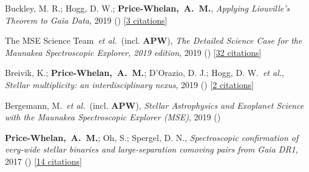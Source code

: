 \item[{\color{deemph}\scriptsize5}]Buckley, M. R.; Hogg, D. W.; \textbf{Price-Whelan,~A.~M.}, \textit{Applying Liouville's Theorem to Gaia Data}, 2019 () [\href{http://adsabs.harvard.edu/abs/2019arXiv190700987B}{3 citations}]

\item[{\color{deemph}\scriptsize4}]The MSE Science Team~\textit{et al.}~(incl. \textbf{APW}), \textit{The Detailed Science Case for the Maunakea Spectroscopic Explorer, 2019 edition}, 2019 () [\href{http://adsabs.harvard.edu/abs/2019arXiv190404907T}{32 citations}]

\item[{\color{deemph}\scriptsize3}]Breivik, K.; \textbf{Price-Whelan,~A.~M.}; D'Orazio, D. J.; Hogg, D. W.~\textit{et al.}, \textit{Stellar multiplicity: an interdisciplinary nexus}, 2019 () [\href{http://adsabs.harvard.edu/abs/2019arXiv190305094B}{2 citations}]

\item[{\color{deemph}\scriptsize2}]Bergemann, M.~\textit{et al.}~(incl. \textbf{APW}), \textit{Stellar Astrophysics and Exoplanet Science with the Maunakea Spectroscopic Explorer (MSE)}, 2019 ()

\item[{\color{deemph}\scriptsize1}]\textbf{Price-Whelan,~A.~M.}; Oh, S.; Spergel, D. N., \textit{Spectroscopic confirmation of very-wide stellar binaries and large-separation comoving pairs from Gaia DR1}, 2017 () [\href{http://adsabs.harvard.edu/abs/2017arXiv170903532P}{14 citations}]